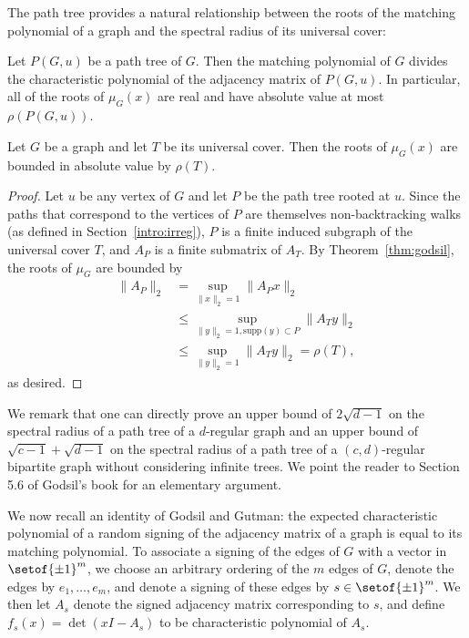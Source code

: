 \documentclass[11pt]{article}
\newcommand{\mydet}[1]{\det\left(#1\right)}
\begin{document}
The path tree provides a natural relationship between the roots of the matching
  polynomial of a graph and the spectral radius of its universal cover:
\begin{theorem} \label{thm:godsil} Let $P (G,u)$ be a
path tree of $G$. Then the matching polynomial of $G$ divides the characteristic polynomial
of the adjacency matrix of $P (G,u)$. In particular, all of the roots of
$\mu_G(x)$ are real and have absolute value at most $\rho(P (G,u))$.
\end{theorem}
\begin{lemma}\label{lem:coverBound}
Let $G$ be a graph and let $T$ be its universal cover. 
Then the roots of $\mu_G(x)$ are bounded in absolute value
  by $\rho(T)$.
\end{lemma}
\begin{proof} Let $u$ be any vertex of $G$ and let $P$ be the path tree rooted
at $u$. Since the paths that correspond to the vertices of $P$ are themselves non-backtracking walks
  (as defined in Section~\ref{intro:irreg}), $P$ is a finite induced subgraph of
  the universal cover $T$, and  $A_P$ is a finite submatrix of
$A_T$. By Theorem~\ref{thm:godsil}, the roots of $\mu_G$ are bounded by
\begin{align*}
\|A_{P}\|_{2} &= \sup_{\|x\|_{2}=1}\|A_{P}x\|_{2} 
\\&\le \sup_{\|y\|_{2}=1,\mathrm{supp}(y)\subset P}\|A_Ty\|_{2} 
\\&\le \sup_{\|y\|_{2}=1}\|A_Ty\|_{2} = \rho(T),
\end{align*}
as desired.
\end{proof}


We remark that one can directly prove
  an upper bound of $2\sqrt{d-1}$ on the spectral radius of a path tree of a $d$-regular graph
  and an upper bound of $\sqrt{c-1}+\sqrt{d-1}$ on the spectral radius of a path tree of a  $(c,d)$-regular bipartite 
  graph without considering infinite trees.
We point the reader to Section 5.6 of Godsil's book \cite{GodsilBook} for an elementary argument.

We now recall an identity of Godsil and Gutman: the
  expected characteristic polynomial of a random signing of the adjacency matrix
  of a graph is equal to its matching polynomial.
To associate a signing of the edges of $G$ with a vector in $\setof{\pm 1}^{m}$,
  we choose an arbitrary ordering of the $m$ edges of $G$,
  denote the edges by $e_{1}, \dotsc , e_{m}$, and denote a signing of
  these edges by $s \in \setof{\pm 1}^{m}$.
We then let $A_{s}$ denote the signed adjacency matrix corresponding to $s$, 
  and define $f_{s} (x) =\mydet{xI-A_s}$ to be characteristic polynomial of $A_{s}$.
\end{document}
